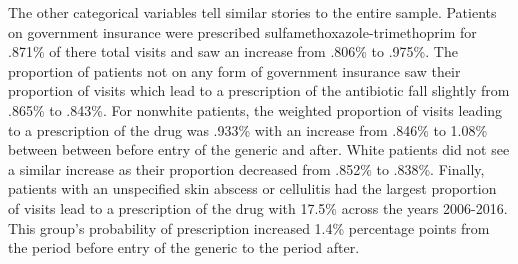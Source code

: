 \indent The other categorical variables tell similar stories to the entire sample. Patients on government insurance were prescribed sulfamethoxazole-trimethoprim for .871\% of there total visits and saw an increase from .806\% to .975\%. The proportion of patients not on any form of government insurance saw their proportion of visits which lead to a prescription of the antibiotic fall slightly from .865\% to .843\%. For nonwhite patients, the weighted proportion of visits leading to a prescription of the drug was .933\% with an increase from .846\% to 1.08\% between between before entry of the generic and after. White patients did not see a similar increase as their proportion decreased from .852\% to .838\%. Finally, patients with an unspecified skin abscess or cellulitis had the largest proportion of visits lead to a prescription of the drug with 17.5\% across the years 2006-2016. This group's probability of prescription increased 1.4\% percentage points from the period before entry of the generic to the period after. 
\begin{landscape}

\end{landscape}